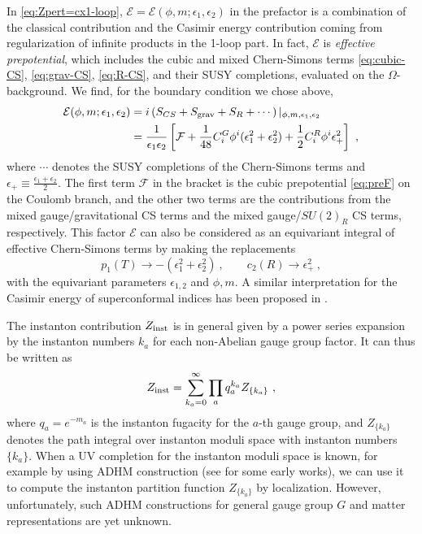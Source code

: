 In \eqref{eq:Zpert=cx1-loop}, $\mathcal{E}=\mathcal{E}(\phi,m;\epsilon_1,\epsilon_2)$ in the prefactor is a combination of the classical contribution and the Casimir energy contribution coming from regularization of infinite products in the 1-loop part. In fact, $\mathcal{E}$ is {\it effective prepotential}, which includes the cubic and mixed Chern-Simons terms \eqref{eq:cubic-CS}, \eqref{eq:grav-CS}, \eqref{eq:R-CS}, and their SUSY completions, evaluated on the $\Omega$-background. We find, for the boundary condition we chose above,
\begin{align}\label{eq:E-func}
	\mathcal{E}(\phi,m;\epsilon_1,\epsilon_2)&=i\left(S_{CS}+S_{\rm grav}+S_R + \cdots \right)|_{\phi, m,\epsilon_1,\epsilon_2} \nonumber\\
	&= \frac{1}{\epsilon_1\epsilon_2}\left[\mathcal{F}+\frac{1}{48}C_i^G \phi^i (\epsilon_1^2+\epsilon_2^2)+\frac{1}{2}C^R_i \phi^i \epsilon_+^2\right] \ ,
\end{align}
where $\cdots$ denotes the SUSY completions of the Chern-Simons terms and $\epsilon_+\equiv \frac{\epsilon_1+\epsilon_2}{2}$. The first term $\mathcal{F}$ in the bracket is the cubic prepotential \eqref{eq:preF} on the Coulomb branch, and the other two terms are the contributions from the mixed gauge/gravitational CS terms and the mixed gauge/$SU(2)_R$ CS terms, respectively. 	This factor $\mathcal{E}$ can also be considered as an equivariant integral of effective Chern-Simons terms by making the replacements
\begin{equation}
	p_1(T)\rightarrow -(\epsilon_1^2+\epsilon_2^2) \ , \qquad c_2(R) \rightarrow \epsilon_+^2 \ ,
\end{equation}
with the equivariant parameters $\epsilon_{1,2}$ and $\phi,m$. A similar interpretation for the Casimir energy of superconformal indices has been proposed in \cite{Bobev:2015kza}.

The instanton contribution $Z_{\rm inst}$ is in general given by a power series expansion by
the instanton numbers $k_a$ for each non-Abelian gauge group factor. It can thus be written as
\begin{equation}
	Z_{\rm inst} = \sum_{k_a=0}^\infty \prod_aq_a^{k_a} Z_{\{k_a\}} \ ,
\end{equation}
where $q_a=e^{-m{}_a}$ is the instanton fugacity for the $a$-th gauge group, and $Z_{\{k_a\}}$ denotes the path integral over instanton moduli space with instanton numbers $\{k_a\}$. When a UV completion for the instanton moduli space is known, for example by using ADHM construction (see \cite{Nekrasov:2002qd,Nekrasov:2003rj,Nekrasov:2004vw,Shadchin:2005mx} for some early works), we can use it to compute the instanton partition function $Z_{\{k_a\}}$ by localization. However, unfortunately, such ADHM constructions for general gauge group $G$ and matter representations are yet unknown. 

